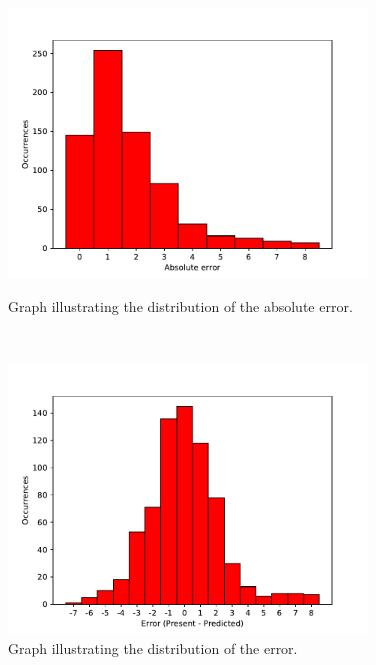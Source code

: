 


\begin{figure}[h!]
\begin{minipage}[b]{8.5cm}
\centering
\includegraphics[width=0.85\textwidth]{images/absoluteerror}
\caption{Graph illustrating the distribution of the absolute error.}
\label{fig:absoluteerror}
\end{minipage}
\ \hspace{2mm} \hspace{3mm} \
\begin{minipage}[b]{8.5cm}
\centering
\includegraphics[width=0.85\textwidth]{images/errorpres}
\caption{Graph illustrating the distribution of the error.}
\label{fig:errorpres}
\end{minipage}
\end{figure}


